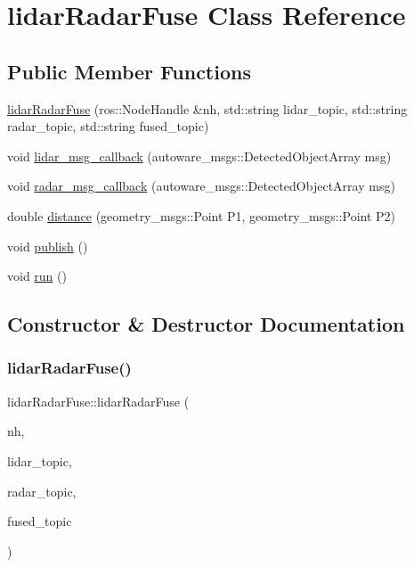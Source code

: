 \hypertarget{classlidarRadarFuse}{}\section{lidar\+Radar\+Fuse Class Reference}
\label{classlidarRadarFuse}
\subsection*{Public Member Functions}
\begin{DoxyCompactItemize}
\item 
\hyperlink{classlidarRadarFuse_a14c2e2556348aa68637ddc9be117065f}{lidar\+Radar\+Fuse} (ros\+::\+Node\+Handle \&nh, std\+::string lidar\+\_\+topic, std\+::string radar\+\_\+topic, std\+::string fused\+\_\+topic)
\item 
void \hyperlink{classlidarRadarFuse_a3fe1662b4743bdff5d40e95f8040e2c2}{lidar\+\_\+msg\+\_\+callback} (autoware\+\_\+msgs\+::\+Detected\+Object\+Array msg)
\item 
void \hyperlink{classlidarRadarFuse_a8ed38d4819e5c1e453b4b2cf599b9958}{radar\+\_\+msg\+\_\+callback} (autoware\+\_\+msgs\+::\+Detected\+Object\+Array msg)
\item 
double \hyperlink{classlidarRadarFuse_abb3cfece2eb2a2394611050d28d82c27}{distance} (geometry\+\_\+msgs\+::\+Point P1, geometry\+\_\+msgs\+::\+Point P2)
\item 
void \hyperlink{classlidarRadarFuse_aac3e1d2b10882c6b4ec0c8c1c078be73}{publish} ()
\item 
void \hyperlink{classlidarRadarFuse_a821c1a1718db7014e50bcad3563df87a}{run} ()
\end{DoxyCompactItemize}


\subsection{Constructor \& Destructor Documentation}
\mbox{\label{classlidarRadarFuse_a14c2e2556348aa68637ddc9be117065f}} 
\subsubsection{\texorpdfstring{lidar\+Radar\+Fuse()}{lidarRadarFuse()}}
{\footnotesize\ttfamily lidar\+Radar\+Fuse\+::lidar\+Radar\+Fuse (\begin{DoxyParamCaption}\item[{ros\+::\+Node\+Handle \&}]{nh,  }\item[{std\+::string}]{lidar\+\_\+topic,  }\item[{std\+::string}]{radar\+\_\+topic,  }\item[{std\+::string}]{fused\+\_\+topic }\end{DoxyParamCaption})\hspace{0.3cm}{\ttfamily [inline]}}



